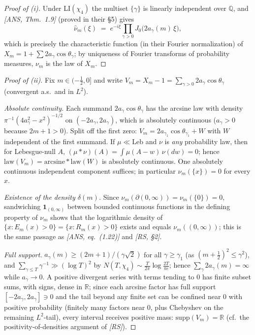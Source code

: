 \begin{proof}[Proof of (i)]
Under LI$(\chi_4)$ the multiset $\{\gamma\}$ is linearly independent
over $\mathbb Q$, and \emph{[ANS, Thm.~1.9]} (proved in their \S5)
gives
\[
\hat\nu_m(\xi)\;=\;e^{-i\xi}\prod_{\gamma>0}
J_0\bigl(2a_\gamma(m)\,\xi\bigr),
\]
which is precisely the characteristic function (in their Fourier
normalization) of $X_m=1+\sum2a_\gamma\cos\theta_\gamma$; by
uniqueness of Fourier transforms of probability measures, $\nu_m$ is
the law of $X_m$.
\end{proof}

\begin{proof}[Proof of (ii)]
Fix $m\in(-\tfrac12,0]$ and write $V_m=X_m-1
=\sum_{\gamma>0}2a_\gamma\cos\theta_\gamma$ (convergent a.s.\ and in
$L^2$).

\emph{Absolute continuity.} Each summand $2a_\gamma\cos\theta_\gamma$
has the arcsine law with density
$\pi^{-1}(4a_\gamma^2-x^2)^{-1/2}$ on $(-2a_\gamma,2a_\gamma)$, which
is absolutely continuous ($a_\gamma>0$ because $2m+1>0$). Split off
the first zero: $V_m=2a_{\gamma_1}\cos\theta_{\gamma_1}+W$ with $W$
independent of the first summand. If $\mu\ll\mathrm{Leb}$ and $\nu$ is
\emph{any} probability law, then for Lebesgue-null $A$,
$(\mu*\nu)(A)=\int\mu(A-w)\,\nu(dw)=0$; hence
$\mathrm{law}(V_m)=\mathrm{arcsine}*\mathrm{law}(W)$ is absolutely
continuous. One absolutely continuous independent component suffices;
in particular $\nu_m(\{x\})=0$ for every $x$.

\emph{Existence of the density $\delta(m)$.} Since
$\nu_m(\partial(0,\infty))=\nu_m(\{0\})=0$, sandwiching
$\mathbf 1_{(0,\infty)}$ between bounded continuous functions in the
defining property of $\nu_m$ shows that the logarithmic density of
$\{x:E_m(x)>0\}=\{x:R_m(x)>0\}$ exists and equals
$\nu_m((0,\infty))$; this is the same passage as \emph{[ANS,
eq.~(1.22)]} and \emph{[RS, \S2]}.

\emph{Full support.} $a_\gamma(m)\ge(2m+1)/(\gamma\sqrt2)$ for all
$\gamma\ge\gamma_1$ (as $(m+\tfrac12)^2\le\gamma^2$), and
$\sum_{\gamma\le T}\gamma^{-1}\gg(\log T)^2$ by
$N(T,\chi_4)\sim\frac{T}{2\pi}\log\frac{2T}{\pi e}$; hence
$\sum_\gamma 2a_\gamma(m)=\infty$ while $a_\gamma\to0$. A positive
divergent series with terms tending to $0$ has finite subset sums,
with signs, dense in $\mathbb R$; since each arcsine factor has full
support $[-2a_\gamma,2a_\gamma]\ni0$ and the tail beyond any finite
set can be confined near $0$ with positive probability (finitely many
factors near $0$, plus Chebyshev on the remaining $L^2$-tail), every
interval receives positive mass: $\mathrm{supp}(V_m)=\mathbb R$ (cf.\
the positivity-of-densities argument of \emph{[RS]}).


\end{proof}
